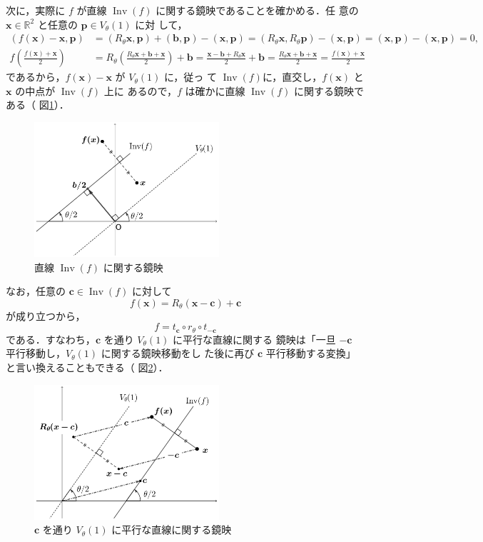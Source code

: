 \documentclass[11pt, uplatex, dvipdfmx, titlepage]{jsarticle}
\DeclareMathOperator{\Inv}{Inv}
\theoremstyle{definition}
\begin{document}
次に，実際に $f$ が直線 $\Inv(f)$ に関する鏡映であることを確かめる．任
意の $\bm{x} \in \mathbb{R}^2$ と任意の $\bm{p} \in V_{\theta}(1)$ に対
して，
\begin{align*}
  \left( f\left(\bm{x}\right) - \bm{x}, \bm{p}\right) 
  &= (R_{\theta}\bm{x}, \bm{p}) +(\bm{b},\bm{p})-(\bm{x},\bm{p})=(R_{\theta}\bm{x}, R_{\theta}\bm{p})-(\bm{x}, \bm{p})
  =(\bm{x},\bm{p}) - (\bm{x}, \bm{p})=0,\\
  f\left(\frac{f(\bm{x})+\bm{x}}{2}\right) 
  &= R_{\theta}\left(
    \frac{R_{\theta}\bm{x} + \bm{b} + \bm{x}}{2}\right) + \bm{b}
  =\frac{\bm{x}-\bm{b}+R_{\theta}\bm{x}}{2} + \bm{b}
  =\frac{R_{\theta}\bm{x}+\bm{b} + \bm{x}}{2} = \frac{f(\bm{x})+\bm{x}}{2}
\end{align*}
であるから，$f(\bm{x})-\bm{x}$ が $V_{\theta}(1)$ に，従っ
て $\Inv(f)$に，直交し，$f(\bm{x})$ と $\bm{x}$ の中点が $\Inv(f)$ 上に
あるので，$f$ は確かに直線 $\Inv(f)$ に関する鏡映である（
図\ref{fig:reflection2gen}）．
\begin{figure}[h]
  \centering
  \includegraphics[height=5cm]{pictures/reflection2gen.pdf}
  \caption{直線 $\Inv(f)$ に関する鏡映}
  \label{fig:reflection2gen}
\end{figure}

なお，任意の $\bm{c} \in \Inv(f)$ に対して
\[
  f(\bm{x}) =  R_{\theta}\left( \bm{x} - \bm{c}\right) + \bm{c}
\]
が成り立つから，
\[
  f = t_{\bm{c}} \circ r_{\theta} \circ t_{-\bm{c}}
\]
である．すなわち，$\bm{c}$ を通り $V_{\theta}(1)$ に平行な直線に関する
鏡映は「一旦 $-\bm{c}$ 平行移動し，$V_{\theta}(1)$ に関する鏡映移動をし
た後に再び $\bm{c}$ 平行移動する変換」と言い換えることもできる（
図\ref{fig:reflection2gen2}）．
\begin{figure}[h]
  \centering
  \includegraphics[height=5cm]{pictures/reflection2gen2.pdf}
  \caption{$\bm{c}$ を通り $V_{\theta}(1)$ に平行な直線に関する鏡映}
  \label{fig:reflection2gen2}
\end{figure}
\end{document}
